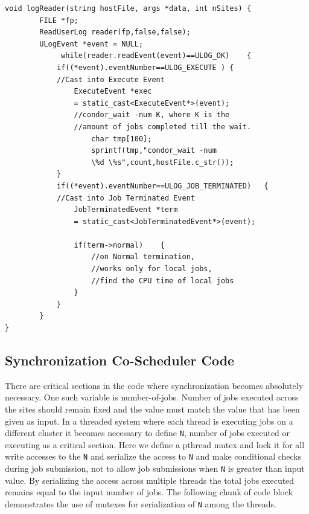 \documentclass[ms,electronic,double]{nuthesis}
\begin{document}
\begin{lstlisting}
void logReader(string hostFile, args *data, int nSites)	{		
		FILE *fp;
		ReadUserLog reader(fp,false,false);
		ULogEvent *event = NULL;		
             while(reader.readEvent(event)==ULOG_OK)	{                    
            if((*event).eventNumber==ULOG_EXECUTE )	{                                
            //Cast into Execute Event
                ExecuteEvent *exec 
                = static_cast<ExecuteEvent*>(event);                                       
                //condor_wait -num K, where K is the 
                //amount of jobs completed till the wait.
                    char tmp[100];
                    sprintf(tmp,"condor_wait -num 
                    \%d \%s",count,hostFile.c_str());
            }            
            if((*event).eventNumber==ULOG_JOB_TERMINATED)	{                
            //Cast into Job Terminated Event
                JobTerminatedEvent *term 
                = static_cast<JobTerminatedEvent*>(event);                
                
                if(term->normal)	{                    
                    //on Normal termination, 
                    //works only for local jobs, 
                    //find the CPU time of local jobs
                }               
            }
        }
}

\end{lstlisting}
\subsection{Synchronization Co-Scheduler Code}

There are critical sections in the code where synchronization becomes absolutely 
necessary. One such variable is number-of-jobs. Number of jobs executed across 
the sites should remain fixed and the value must match the value that has been 
given as input. In a threaded system where each thread is executing jobs on a 
different cluster it becomes necessary to define \texttt{N}, number of jobs executed or executing as a 
critical section. Here we define a pthread mutex and lock it for all write accesses to the \texttt{N}
and serialize the access to \texttt{N} and make conditional checks during job submission, not to allow
job submissions when \texttt{N} is greater than input value. By 
serializing the access across multiple threads the total jobs executed remains 
equal to the input number of jobs. The following chunk of code block 
demonstrates the use of mutexes for serialization of  \texttt{N} among the threads.
\end{document}
